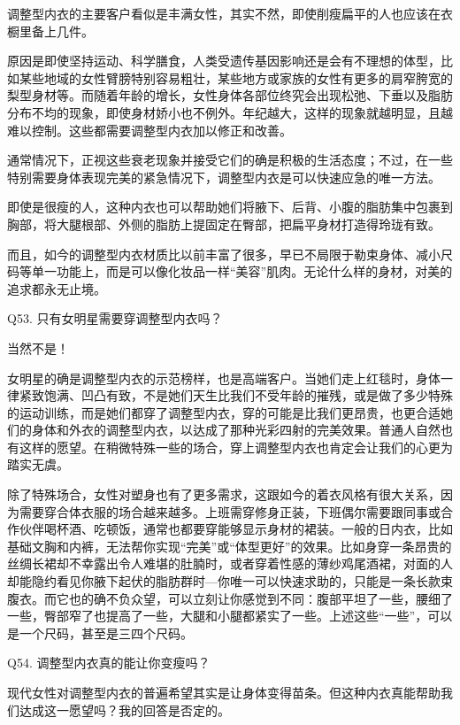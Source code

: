 \documentclass[12pt,UTF8]{ctexbook}
\begin{document}
调整型内衣的主要客户看似是丰满女性，其实不然，即使削瘦扁平的人也应该在衣橱里备上几件。

原因是即使坚持运动、科学膳食，人类受遗传基因影响还是会有不理想的体型，比如某些地域的女性臂膀特别容易粗壮，某些地方或家族的女性有更多的肩窄胯宽的梨型身材等。而随着年龄的增长，女性身体各部位终究会出现松弛、下垂以及脂肪分布不均的现象，即使身材娇小也不例外。年纪越大，这样的现象就越明显，且越难以控制。这些都需要调整型内衣加以修正和改善。

通常情况下，正视这些衰老现象并接受它们的确是积极的生活态度；不过，在一些特别需要身体表现完美的紧急情况下，调整型内衣是可以快速应急的唯一方法。

即使是很瘦的人，这种内衣也可以帮助她们将腋下、后背、小腹的脂肪集中包裹到胸部，将大腿根部、外侧的脂肪上提固定在臀部，把扁平身材打造得玲珑有致。

而且，如今的调整型内衣材质比以前丰富了很多，早已不局限于勒束身体、减小尺码等单一功能上，而是可以像化妆品一样“美容”肌肉。无论什么样的身材，对美的追求都永无止境。





Q53. 只有女明星需要穿调整型内衣吗？


当然不是！

女明星的确是调整型内衣的示范榜样，也是高端客户。当她们走上红毯时，身体一律紧致饱满、凹凸有致，不是她们天生比我们不受年龄的摧残，或是做了多少特殊的运动训练，而是她们都穿了调整型内衣，穿的可能是比我们更昂贵，也更合适她们的身体和外衣的调整型内衣，以达成了那种光彩四射的完美效果。普通人自然也有这样的愿望。在稍微特殊一些的场合，穿上调整型内衣也肯定会让我们的心更为踏实无虞。

除了特殊场合，女性对塑身也有了更多需求，这跟如今的着衣风格有很大关系，因为需要穿合体衣服的场合越来越多。上班需穿修身正装，下班偶尔需要跟同事或合作伙伴喝杯酒、吃顿饭，通常也都要穿能够显示身材的裙装。一般的日内衣，比如基础文胸和内裤，无法帮你实现“完美”或“体型更好”的效果。比如身穿一条昂贵的丝绸长裙却不幸露出令人难堪的肚腩时，或者穿着性感的薄纱鸡尾酒裙，对面的人却能隐约看见你腋下起伏的脂肪群时—你唯一可以快速求助的，只能是一条长款束腹衣。而它也的确不负众望，可以立刻让你感觉到不同：腹部平坦了一些，腰细了一些，臀部窄了也提高了一些，大腿和小腿都紧实了一些。上述这些“一些”，可以是一个尺码，甚至是三四个尺码。





Q54. 调整型内衣真的能让你变瘦吗？


现代女性对调整型内衣的普遍希望其实是让身体变得苗条。但这种内衣真能帮助我们达成这一愿望吗？我的回答是否定的。
\end{document}
